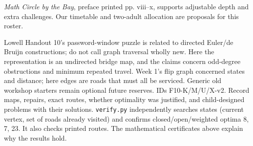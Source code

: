 \documentclass[11pt]{article}
\begin{document}
\emph{Math Circle by the Bay}, preface printed pp. viii--x, supports adjustable depth and extra challenges. Our timetable and two-adult allocation are proposals for this roster.

Lowell Handout 10's password-window puzzle is related to directed Euler/de Bruijn constructions; do not call graph traversal wholly new. Here the representation is an undirected bridge map, and the claims concern odd-degree obstructions and minimum repeated travel. Week 1's flip graph concerned states and distance; here edges are roads that must all be serviced. Generic old workshop starters remain optional future reserves.
IDs F10-K/M/U/X-v2. Record maps, repairs, exact routes, whether optimality was justified, and child-designed problems with their solutions. \texttt{verify.py} independently searches states (current vertex, set of roads already visited) and confirms closed/open/weighted optima 8, 7, 23. It also checks printed routes. The mathematical certificates above explain why the results hold.
\end{document}
